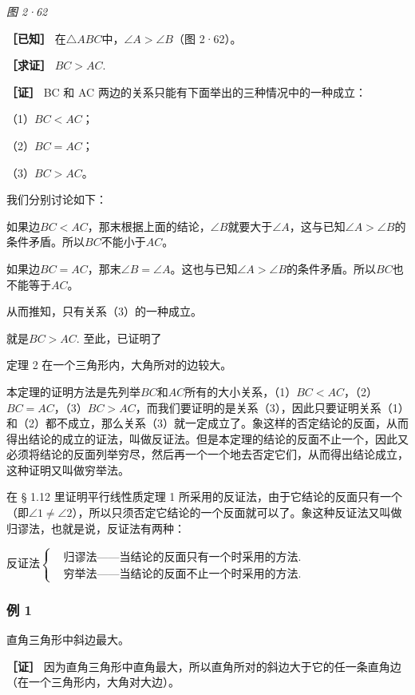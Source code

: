 \emph{图 2·62}

\textbf{［已知］} 在\(\triangle ABC\)中，\(\angle A > \angle B\)（图
2·62）。

\textbf{［求证］} \(BC > AC.\)

\textbf{［证］} BC 和 AC
两边的关系只能有下面举出的三种情况中的一种成立：

（1）\(BC < AC\)；

（2）\(BC = AC\)；

（3）\(BC > AC\)。

我们分别讨论如下：

如果边\(BC < AC\)，那末根据上面的结论，\(\angle B\)就要大于\(\angle A\)，这与已知\(\angle A > \angle B\)的条件矛盾。所以\(BC\)不能小于\(AC\)。

如果边\(BC = AC\)，那末\(\angle B = \angle A\)。这也与已知\(\angle A > \angle B\)的条件矛盾。所以\(BC\)也不能等于\(AC\)。

从而推知，只有关系（3）的一种成立。

就是\(BC > AC.\) 至此，已证明了

定理 2 在一个三角形内，大角所对的边较大。

本定理的证明方法是先列举\(BC\)和\(AC\)所有的大小关系，（1）\(BC < AC\)，（2）\(BC = AC\)，（3）\(BC > AC\)，而我们要证明的是关系（3），因此只要证明关系（1）和（2）都不成立，那么关系（3）就一定成立了。象这样的否定结论的反面，从而得出结论的成立的证法，叫做反证法。但是本定理的结论的反面不止一个，因此又必须将结论的反面列举穷尽，然后再一个一个地去否定它们，从而得出结论成立，这种证明又叫做穷举法。

在 § 1.12 里证明平行线性质定理 1
所采用的反证法，由于它结论的反面只有一个（即\(\angle 1 \neq \angle 2\)），所以只须否定它结论的一个反面就可以了。象这种反证法又叫做归谬法，也就是说，反证法有两种：

反证法\(\left\{\begin{aligned}& \text{归谬法}——\text{当结论的反面只有一个时采用的方法}.\\& \text{穷举法}——\text{当结论的反面不止一个时采用的方法}.\end{aligned}\right.\)

\subsubsection{例 1}

直角三角形中斜边最大。

\textbf{［证］}
因为直角三角形中直角最大，所以直角所对的斜边大于它的任一条直角边（在一个三角形内，大角对大边）。

